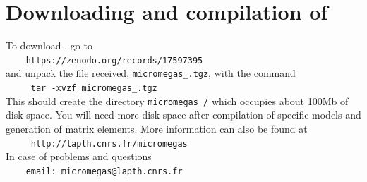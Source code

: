 \documentclass[12pt,a4paper]{article}
\begin{document}
  
\section{Downloading and compilation of \micro}
To   download  \micro, go to    \\  
\verb|    https://zenodo.org/records/17597395|\\
and unpack the file received, \verb|micromegas_|\VERSION\verb|.tgz|, with the command\\
\verb|     tar -xvzf micromegas_|\VERSION\verb|.tgz|\\
This should create the directory \verb|micromegas_|\VERSION\verb|/| which occupies about 100Mb of disk space. You will need more disk space after compilation of
specific models and generation of matrix elements. More information can also be found at\\
\verb|     http://lapth.cnrs.fr/micromegas|\\
In case of problems and questions\\
\verb|    email: micromegas@lapth.cnrs.fr|\\
\end{document}
